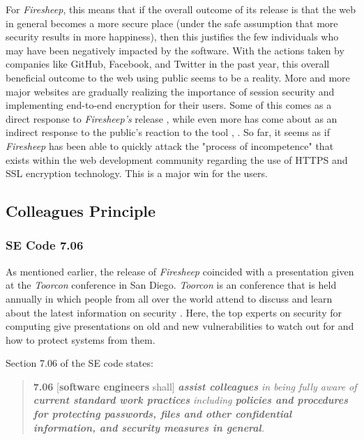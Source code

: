 \documentclass[11pt]{article}
\begin{document}
\begin{multicols}{2}
For \emph{Firesheep}, this means that if the overall outcome of its release is that the web in general becomes a more secure place (under the safe assumption that more security results in more happiness), then this justifies the few individuals who may have been negatively impacted by the software. With the actions taken by companies like GitHub, Facebook, and Twitter in the past year, this overall beneficial outcome to the web using public seems to be a reality. More and more major websites are gradually realizing the importance of session security and implementing end-to-end encryption for their users. Some of this comes as a direct response to \emph{Firesheep's} release \cite{github_reaction}, while even more has come about as an indirect response to the public's reaction to the tool \cite{facebook_reaction}, \cite{twitter_reaction}. So far, it seems as if \emph{Firesheep} has been able to quickly attack the "process of incompetence" that exists within the web development community regarding the use of HTTPS and SSL encryption technology. This is a major win for the users.

\subsection{Colleagues Principle}
\subsubsection{SE Code 7.06}
As mentioned earlier, the release of \emph{Firesheep} coincided with a presentation given at the \emph{Toorcon} conference in San Diego. \emph{Toorcon} is an conference that is held annually in which people from all over the world attend to discuss and learn about the latest information on security \cite{toorcon}. Here, the top experts on security for computing give presentations on old and new vulnerabilities to watch out for and how to protect systems from them.

Section 7.06 of the SE code states:

\begin{quote}
  \textbf{7.06} [\textbf{software engineers} shall] \emph{\textbf{assist colleagues} in being fully aware of \textbf{current standard work practices} including \textbf{policies and procedures for protecting passwords, files and other confidential information, and security measures in general}.} \cite{se_code}
\end{quote}


\end{multicols}
\end{document}
